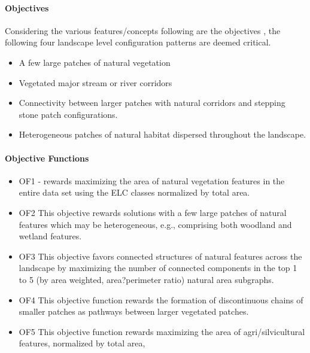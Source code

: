 \documentclass[twoside,10pt]{article}
\begin{document}
\paragraph*{Objectives}
Considering the various features/concepts following are the objectives ,  the following four landscape level configuration patterns are deemed critical.

\begin{itemize}
  \item A few large patches of natural vegetation
 \item  Vegetated major stream or river corridors
 \item   Connectivity between larger patches with natural corridors and stepping stone patch configurations.
 \item  Heterogeneous patches of natural habitat dispersed throughout the landscape.
\end{itemize}
\paragraph*{Objective Functions}
\begin{itemize}
  \item OF1 - rewards maximizing the area of natural vegetation features in the entire data
set using the ELC classes normalized by total area.
 \item OF2 This objective rewards solutions with a few large patches of natural features which may be heterogeneous, e.g., comprising both woodland and wetland features.
 \item OF3 This objective favors connected structures of natural features across the landscape by maximizing the number of connected components in the top 1 to 5 (by area weighted, area?perimeter ratio) natural area subgraphs.
 \item OF4 This objective function rewards the formation of
discontinuous chains of smaller patches as pathways between larger vegetated
patches.
 \item OF5 This objective function rewards maximizing the area of agri/silvicultural features, normalized by total area,

\end{itemize}
\end{document}
